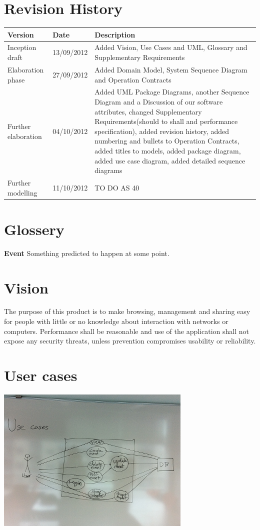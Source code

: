 \documentclass[a4paper,10pt,titlepage]{article}
\begin{document}
\section{Revision History}

\begin{center}
    \begin{tabular}{ | l | l | p{7cm}  | }
    \hline
    Version & Date & Description \\ \hline
    Inception draft & 13/09/2012 & Added Vision, Use Cases and UML, Glossary and Supplementary Requirements	\\ \hline
    Elaboration phase & 27/09/2012 & Added Domain Model, System Sequence Diagram and Operation Contracts\\ \hline
    Further elaboration & 04/10/2012 & Added UML Package Diagrams, another Sequence Diagram and a Discussion of our software attributes, changed Supplementary Requirements(should to shall and performance specification), added revision history, added numbering and bullets to Operation Contracts, added titles to models, added package diagram, added use case diagram, added detailed sequence diagrams \\ \hline
    Further modelling & 11/10/2012 & TO DO AS 40	\\ \hline
    \end{tabular}
\end{center}

\section{Glossery}
	\textbf{Event}
	Something predicted to happen at some point.
	
\section{Vision}
	The purpose of this product is to make browsing, management and sharing easy for people with little or no knowledge about interaction with networks or computers. Performance shall be reasonable and use of the application shall not expose any security threats, unless prevention compromises usability or reliability.
	
\section{User cases}

	\includegraphics[width=0.7\textwidth]{./useCases}\\[1cm] 
\end{document}

